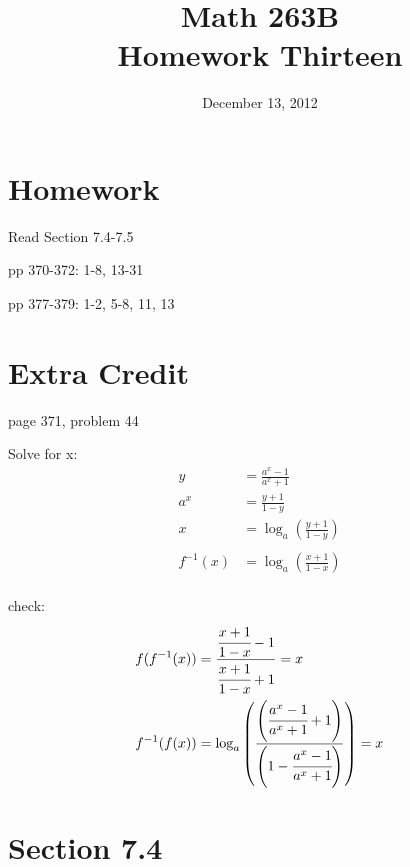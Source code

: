 \documentclass{exam}
\title{Math 263B \\ Homework Thirteen}
\date{December 13, 2012}
\begin{document}
\maketitle

\section{Homework}

\begin{itemize*}
  \item Read Section 7.4-7.5
  \item pp 370-372: 1-8, 13-31
  \item pp 377-379: 1-2, 5-8, 11, 13
\end{itemize*}

\ifprintanswers
\pagebreak
\fi

\section{Extra Credit}
page 371, problem 44

\ifprintanswers
\begin{solution}
Solve for x:
\begin{align*}
  y &= \frac{a^x - 1}{a^x + 1} \\
  a^x &= \frac{y + 1}{1 - y} \\
  x &= \log_a \left( \frac{y + 1}{1 - y} \right) \\
\\
  f^{-1}(x) &= \log_a \left( \frac{x + 1}{1 - x} \right) \\
\end{align*}

check:
\begin{align*}
  f(f^{-1}(x)) &= \frac{\cfrac{x + 1}{1 - x} - 1}{\cfrac{x + 1}{1 - x} + 1} = x \\
  f^{-1}(f(x)) &= \log_a \left( \frac{\left( \cfrac{a^x - 1}{a^x + 1} + 1 \right)}{\left(1 - \cfrac{a^x - 1}{a^x + 1} \right)} \right) = x \\
\end{align*}

\end{solution}

\section{Section 7.4}
\end{document}
